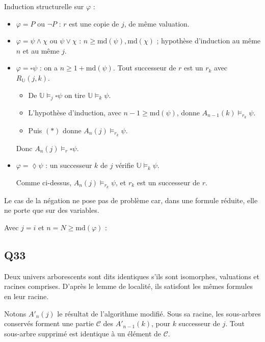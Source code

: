 \documentclass[11pt,a4paper]{article}
\providecommand{\tightlist}{\setlength{\itemsep}{0pt}\setlength{\parskip}{0pt}}
\providecommand{\Box}{\square}
\providecommand{\Diamond}{\lozenge}
\newcommand{\equationajustee}[1]{%
  \sbox{\boiteequation}{$\displaystyle #1$}%
  \ifdim\wd\boiteequation>\linewidth
    \[\resizebox{\linewidth}{!}{\usebox{\boiteequation}}\]%
  \else
    \[#1\]%
  \fi}
\begin{document}
Induction structurelle sur \(\varphi\) :

\begin{itemize}
\item
  \(\varphi=P\) ou \(\neg P\) : \(r\) est une copie de \(j\), de même valuation.
\item
  \(\varphi=\psi\wedge\chi\) ou \(\psi\vee\chi\) : \(n\ge\mathrm{md}(\psi),\mathrm{md}(\chi)\) ; hypothèse d'induction au même \(n\) et au même \(j\).
\item
  \(\varphi=\Box\psi\) : on a \(n\ge1+\mathrm{md}(\psi)\). Tout successeur de \(r\) est un \(r_k\) avec \(R_{\mathbb U}(j,k)\).

  \begin{itemize}
  \tightlist
  \item
    De \(\mathbb U\models_j\Box\psi\) on tire \(\mathbb U\models_k\psi\).
  \item
    L'hypothèse d'induction, avec \(n-1\ge\mathrm{md}(\psi)\), donne \(A_{n-1}(k)\models_{r_k}\psi\).
  \item
    Puis \((\ast)\) donne \(A_n(j)\models_{r_k}\psi\).
  \end{itemize}

  Donc \(A_n(j)\models_r\Box\psi\).
\item
  \(\varphi=\Diamond\psi\) : un successeur \(k\) de \(j\) vérifie \(\mathbb U\models_k\psi\).

  Comme ci-dessus, \(A_n(j)\models_{r_k}\psi\), et \(r_k\) est un successeur de \(r\).
\end{itemize}

Le cas de la négation ne pose pas de problème car, dans une formule réduite, elle ne porte que sur des variables.

Avec \(j=i\) et \(n=N\ge\mathrm{md}(\varphi)\) :

\equationajustee{\boxed{\mathbb U\models_i\varphi\ \Longrightarrow\ \mathbb A\models_r\varphi}}

\hypertarget{q33}{%
\subsection{Q33}\label{q33}}

Deux univers arborescents sont dits identiques s'ils sont isomorphes, valuations et racines comprises. D'après le lemme de localité, ils satisfont les mêmes formules en leur racine.

Notons \(A'_n(j)\) le résultat de l'algorithme modifié. Sous sa racine, les sous-arbres conservés forment une partie \(\mathcal C\) des \(A'_{n-1}(k)\), pour \(k\) successeur de \(j\). Tout sous-arbre supprimé est identique à un élément de \(\mathcal C\).
\end{document}
